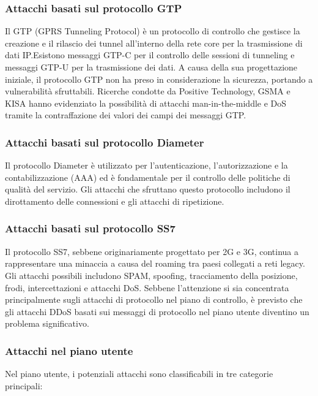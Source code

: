 \documentclass[english]{article}
\begin{document}
\subsubsection{Attacchi basati sul protocollo GTP}
Il GTP (GPRS Tunneling Protocol) è un protocollo di controllo che gestisce la
creazione e il rilascio dei tunnel all'interno della rete core per la
trasmissione di dati IP.\@ Esistono messaggi GTP-C per il controllo delle
sessioni di tunneling e messaggi GTP-U per la trasmissione dei dati. A causa
della sua progettazione iniziale, il protocollo GTP non ha preso in
considerazione la sicurezza, portando a vulnerabilità sfruttabili. Ricerche
condotte da Positive Technology, GSMA e KISA hanno evidenziato la possibilità
di attacchi man-in-the-middle e DoS tramite la contraffazione dei valori dei
campi dei messaggi GTP.\@

\subsubsection{Attacchi basati sul protocollo Diameter}
Il protocollo Diameter è utilizzato per l'autenticazione, l'autorizzazione e la
contabilizzazione (AAA) ed è fondamentale per il controllo delle politiche di
qualità del servizio. Gli attacchi che sfruttano questo protocollo includono il
dirottamento delle connessioni e gli attacchi di ripetizione.

\subsubsection{Attacchi basati sul protocollo SS7}
Il protocollo SS7, sebbene originariamente progettato per 2G e 3G, continua a
rappresentare una minaccia a causa del roaming tra paesi collegati a reti
legacy. Gli attacchi possibili includono SPAM, spoofing, tracciamento della
posizione, frodi, intercettazioni e attacchi DoS. Sebbene l'attenzione si sia
concentrata principalmente sugli attacchi di protocollo nel piano di controllo,
è previsto che gli attacchi DDoS basati sui messaggi di protocollo nel piano
utente diventino un problema significativo.

\subsubsection{Attacchi nel piano utente}
Nel piano utente, i potenziali attacchi sono classificabili in tre categorie
principali:
\end{document}

